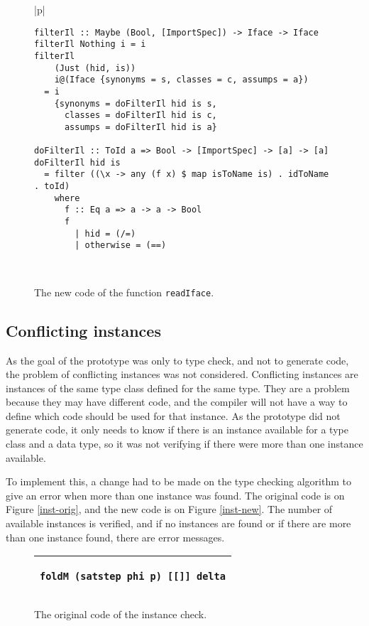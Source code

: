 \documentclass[msc]{ppgccufmg}
\begin{document}
\begin{figure}
\caption{The new code of the function \texttt{readIface}.\label{il-new}}
\begin{tabular}{|p{\textwidth}|}
\hline
\begin{verbatim}
filterIl :: Maybe (Bool, [ImportSpec]) -> Iface -> Iface
filterIl Nothing i = i
filterIl
    (Just (hid, is))
    i@(Iface {synonyms = s, classes = c, assumps = a})
  = i
    {synonyms = doFilterIl hid is s,
      classes = doFilterIl hid is c,
      assumps = doFilterIl hid is a}

doFilterIl :: ToId a => Bool -> [ImportSpec] -> [a] -> [a]
doFilterIl hid is
  = filter ((\x -> any (f x) $ map isToName is) . idToName . toId)
    where
      f :: Eq a => a -> a -> Bool
      f
        | hid = (/=)
        | otherwise = (==)
\end{verbatim}
\\
\hline
\end{tabular}
\end{figure}

\subsection{Conflicting instances}

As the goal of the prototype was only to type check, and not to generate code, the problem of conflicting instances was not considered.
Conflicting instances are instances of the same type class defined for the same type.
They are a problem because they may have different code, and the compiler will not have a way to define which code should be used for that instance.
As the prototype did not generate code, it only needs to know if there is an instance available for a type class and a data type, so it was not verifying if there were more than one instance available.

To implement this, a change had to be made on the type checking algorithm to give an error when more than one instance was found.
The original code is on Figure \ref{inst-orig}, and the new code is on Figure \ref{inst-new}.
The number of available instances is verified, and if no instances are found or if there are more than one instance found, there are error messages.

\begin{figure}
\caption{The original code of the instance check.\label{il-orig}}
\begin{tabular}{|p{\textwidth}|}
\hline
\begin{verbatim}
foldM (satstep phi p) [[]] delta
\end{verbatim}
\\
\hline
\end{tabular}
\end{figure}
\end{document}
